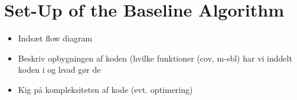 \section{Set-Up of the Baseline Algorithm}
    \begin{itemize}
        \item Indsæt flow diagram
        \item Beskriv opbygningen af koden (hvilke funktioner (cov, m-sbl) har vi inddelt koden i og hvad gør de
        \item Kig på kompleksiteten af kode (evt. optimering)
    \end{itemize}